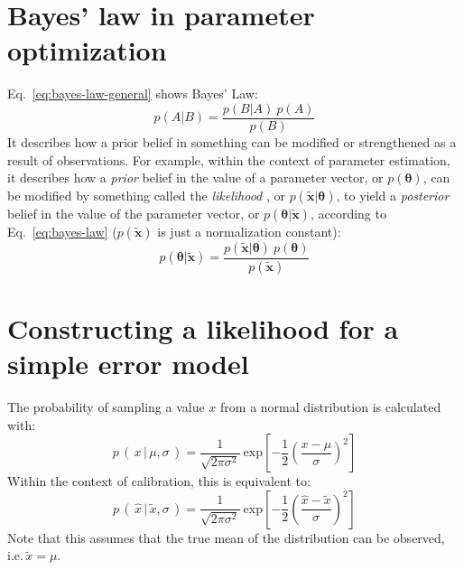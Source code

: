 \section{Bayes' law in parameter optimization}

Eq.~\ref{eq:bayes-law-general} shows Bayes' Law:
\begin{equation}\label{eq:bayes-law-general}
p(A|B) = \frac{p(B|A)\:p(A)}{p(B)}
\end{equation}
It describes how a prior belief in something can be modified or strengthened as
a result of observations. For example, within the context of parameter
estimation, it describes how a \textit{prior} belief in the value of a parameter
vector, or $p(\boldsymbol\theta)$, can be modified by something called the
\textit{likelihood} , or $p(\tilde{\mathbf{x}}|\boldsymbol\theta)$, to yield a
\textit{posterior} belief in the value of the parameter vector, or
$p(\boldsymbol\theta|\tilde{\mathbf{x}})$,  according to Eq.~\ref{eq:bayes-law}
($p(\tilde{\mathbf{x}})$ is just a normalization constant):
\begin{equation}\label{eq:bayes-law}
p(\boldsymbol\theta|\tilde{\mathbf{x}}) =
\frac{p(\tilde{\mathbf{x}}|\boldsymbol\theta)\:p(\boldsymbol\theta)}{p(\tilde{\mathbf{x}})}
\end{equation}

\section{Constructing a likelihood for a simple error model}
The probability of sampling a value $x$ from a normal distribution  is
calculated with:
\begin{equation}\label{eq:normal-distribution}
p\,(\,x\,|\,\mu,\sigma\,) =
\frac{1}{\sqrt{2\pi\sigma^2}}\:\mathrm{exp}\left[{-\frac{1}{2}\left(\frac{x-\mu}{\sigma}\right)^2}\right]
\end{equation}
Within the context of calibration, this is equivalent to:
\begin{equation}\label{eq:normal-distribution-calibration}
p\,(\,\hat{x}\,|\,\tilde{x},\sigma\,) =
\frac{1}{\sqrt{2\pi\sigma^2}}\:\mathrm{exp}\left[{-\frac{1}{2}\left(\frac{\hat{x}-\tilde{x}}{\sigma}\right)^2}\right]
\end{equation}
Note that this assumes that the true mean of the distribution can be observed,
i.e.\,$\tilde{x}=\mu$.

